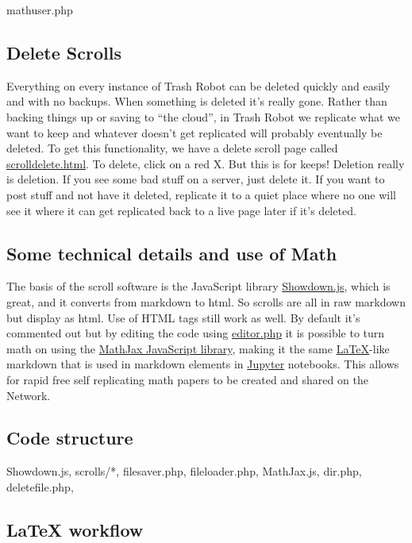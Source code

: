 mathuser.php

\subsection{Delete Scrolls}\label{delete-scrolls}

Everything on every instance of Trash Robot can be deleted quickly and
easily and with no backups. When something is deleted it's really gone.
Rather than backing things up or saving to ``the cloud'', in Trash Robot
we replicate what we want to keep and whatever doesn't get replicated
will probably eventually be deleted. To get this functionality, we have
a delete scroll page called \url{scrolldelete.html}. To delete, click on
a red X. But this is for keeps! Deletion really is deletion. If you see
some bad stuff on a server, just delete it. If you want to post stuff
and not have it deleted, replicate it to a quiet place where no one will
see it where it can get replicated back to a live page later if it's
deleted.

\subsection{Some technical details and use of
Math}\label{some-technical-details-and-use-of-math}

The basis of the scroll software is the JavaScript library
\href{http://showdownjs.com/}{Showdown.js}, which is great, and it
converts from markdown to html. So scrolls are all in raw markdown but
display as html. Use of HTML tags still work as well. By default it's
commented out but by editing the code using \url{editor.php} it is
possible to turn math on using the
\href{https://www.mathjax.org/}{MathJax JavaScript library}, making it
the same \href{https://www.latex-project.org/}{LaTeX}-like markdown that
is used in markdown elements in \href{https://jupyter.org/}{Jupyter}
notebooks. This allows for rapid free self replicating math papers to be
created and shared on the Network.

\subsection{Code structure}\label{code-structure}

Showdown.js, scrolls/*, filesaver.php, fileloader.php, MathJax.js,
dir.php, deletefile.php,

\subsection{LaTeX workflow}\label{latex-workflow}

